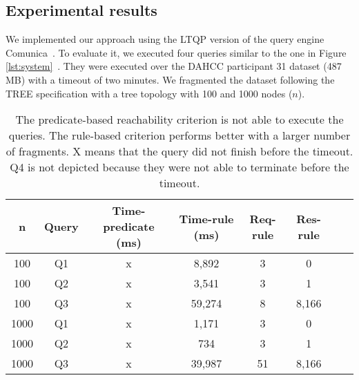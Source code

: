 \subsection{Experimental results}

We implemented our approach using the LTQP version of the query engine Comunica~\cite{comunica}.
To evaluate it, we executed four queries similar to the one in Figure \ref{lst:system}~.
They were executed over the DAHCC participant 31 dataset (487 MB) with a timeout of two minutes.
We fragmented the dataset following the TREE specification with a tree topology with 100 and 1000 nodes ($n$).


\begin{table}[ht]
    \centering
    \begin{tabular}{|c|c|c|c|c|c|c|c|}
        \hline
        \textbf{n} & \textbf{Query} & \textbf{Time-predicate (ms)}  & \textbf{Time-rule (ms)} & \textbf{Req-rule} & \textbf{Res-rule} \\
        \hline
        100 & Q1 & x & 8,892& 3 & 0 \\
        100 & Q2 & x & 3,541& 3 & 1 \\
        100 & Q3 & x & 59,274& 8 & 8,166 \\
        \hhline{|=|=|=|=|=|=|=|=|}
        1000 & Q1 & x & 1,171& 3 & 0 \\
        1000 & Q2 & x & 734& 3 & 1 \\
        1000 & Q3 & x & 39,987& 51 & 8,166 \\
        \hline
    \end{tabular}
    \caption{
    The predicate-based reachability criterion is not able to execute the queries. 
    The rule-based criterion performs better with a larger number of fragments.
    X means that the query did not finish before the timeout.
    Q4 is not depicted because they were not able to terminate before the timeout.}
    \label{tab:result}
\end{table}


